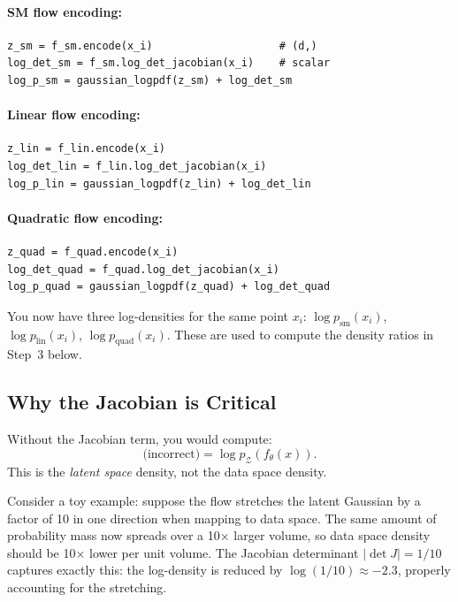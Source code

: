 \documentclass[11pt, a4paper]{article}
\begin{document}
\paragraph{SM flow encoding:}
\begin{lstlisting}
z_sm = f_sm.encode(x_i)                    # (d,)
log_det_sm = f_sm.log_det_jacobian(x_i)    # scalar
log_p_sm = gaussian_logpdf(z_sm) + log_det_sm
\end{lstlisting}

\paragraph{Linear flow encoding:}
\begin{lstlisting}
z_lin = f_lin.encode(x_i)
log_det_lin = f_lin.log_det_jacobian(x_i)
log_p_lin = gaussian_logpdf(z_lin) + log_det_lin
\end{lstlisting}

\paragraph{Quadratic flow encoding:}
\begin{lstlisting}
z_quad = f_quad.encode(x_i)
log_det_quad = f_quad.log_det_jacobian(x_i)
log_p_quad = gaussian_logpdf(z_quad) + log_det_quad
\end{lstlisting}

You now have three log-densities for the same point $x_i$:
$\log p_\mathrm{sm}(x_i)$, $\log p_\mathrm{lin}(x_i)$, $\log p_\mathrm{quad}(x_i)$.
These are used to compute the density ratios in Step~3 below.

\subsection{Why the Jacobian is Critical}

Without the Jacobian term, you would compute:
\begin{equation}
    \text{(incorrect)} = \log p_\mathcal{Z}(f_\theta(x)).
\end{equation}
This is the \emph{latent space} density, not the data space density.

Consider a toy example: suppose the flow stretches the latent Gaussian by a
factor of 10 in one direction when mapping to data space.
The same amount of probability mass now spreads over a 10× larger volume, so
data space density should be 10× lower per unit volume.
The Jacobian determinant $|\det J| = 1/10$ captures exactly this: the log-density
is reduced by $\log(1/10) \approx -2.3$, properly accounting for the stretching.
\end{document}
